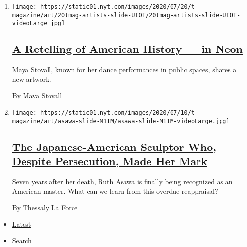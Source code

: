 \begin{enumerate}
\def\labelenumi{\arabic{enumi}.}
\item
  \texttt{[image: https://static01.nyt.com/images/2020/07/20/t-magazine/art/20tmag-artists-slide-UIOT/20tmag-artists-slide-UIOT-videoLarge.jpg]}

  \hypertarget{a-retelling-of-american-history--in-neon}{%
  \subsection{\texorpdfstring{\href{/2020/07/20/t-magazine/maya-stovall.html}{A
  Retelling of American History --- in
  Neon}}{A Retelling of American History --- in Neon}}\label{a-retelling-of-american-history--in-neon}}

  Maya Stovall, known for her dance performances in public spaces,
  shares a new artwork.

  By Maya Stovall
\item
  \texttt{[image: https://static01.nyt.com/images/2020/07/10/t-magazine/art/asawa-slide-M1IM/asawa-slide-M1IM-videoLarge.jpg]}

  \hypertarget{the-japanese-american-sculptor-who-despite-persecution-made-her-mark}{%
  \subsection{\texorpdfstring{\href{/2020/07/20/t-magazine/ruth-asawa.html}{The
  Japanese-American Sculptor Who, Despite Persecution, Made Her
  Mark}}{The Japanese-American Sculptor Who, Despite Persecution, Made Her Mark}}\label{the-japanese-american-sculptor-who-despite-persecution-made-her-mark}}

  Seven years after her death, Ruth Asawa is finally being recognized as
  an American master. What can we learn from this overdue reappraisal?

  By Thessaly La Force
\end{enumerate}

\begin{itemize}
\tightlist
\item
  \protect\hyperlink{stream-panel}{Latest}
\item
  Search
\end{itemize}

